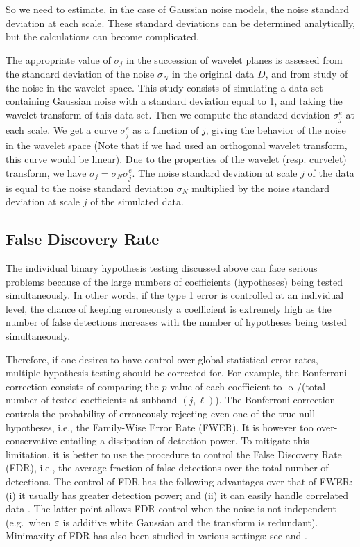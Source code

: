 So we need to estimate, in the case of Gaussian noise models, the noise standard deviation at each scale. 
These standard deviations can be determined analytically, but the calculations can become complicated.  

The appropriate value of $\sigma_j$ in the succession of wavelet planes is assessed from the standard deviation 
of the noise $\sigma_N$ in the original data $D$, and from study of the noise in the wavelet space. This study 
consists of simulating a data set containing Gaussian noise with a standard deviation equal to 1, and taking the 
wavelet transform of this data set. Then we compute the standard deviation $\sigma^e_j$ at each scale. We get a curve 
$\sigma^e_j$ as a function of $j$, giving the behavior of the noise in the wavelet space (Note that if we had used 
an orthogonal wavelet transform, this curve would be linear). Due to the properties of the wavelet (resp. curvelet) 
transform, we have $ \sigma_j = \sigma_N \sigma^e_j $. The noise standard deviation at scale $j$ of the data is equal 
to the noise standard deviation $\sigma_N$ multiplied by the noise standard deviation at scale $j$ of the simulated data.

\newpage
\subsection{False Discovery Rate}
The individual binary hypothesis testing discussed above can face serious problems because of the large numbers 
of coefficients (hypotheses) being tested simultaneously. In other words, if the type 1 error is controlled at 
an individual level, the chance of keeping erroneously a coefficient is extremely high as the number of false 
detections increases with the number of hypotheses being tested simultaneously. 

Therefore, if one desires to have control over global statistical error rates, multiple hypothesis testing 
should be corrected for. For example, the Bonferroni correction consists of comparing the $p$-value of each 
coefficient to $\upalpha/$(total number of tested coefficients at subband $(j,\ell)$). The Bonferroni correction 
controls the probability of erroneously rejecting even one of the true null hypotheses, i.e., the Family-Wise Error Rate (FWER). 
It is however too over-conservative entailing a dissipation of detection power. To mitigate this limitation, 
it is better to use the \citep{benjamini95} procedure to control the False Discovery Rate (FDR), i.e., 
the average fraction of false detections over the total number of detections. The control of FDR has the following 
advantages over that of FWER: (i) it usually has greater detection power; and (ii) it can easily handle 
correlated data \citep{Benjamini2001}. The latter point allows FDR control when the noise is not independent 
(e.g.\ when ${\varepsilon}$ is additive white Gaussian and the transform is redundant). Minimaxity of FDR has also been 
studied in various settings: see \citep{Abramovich2006} and \citep{Donoho2006}.

